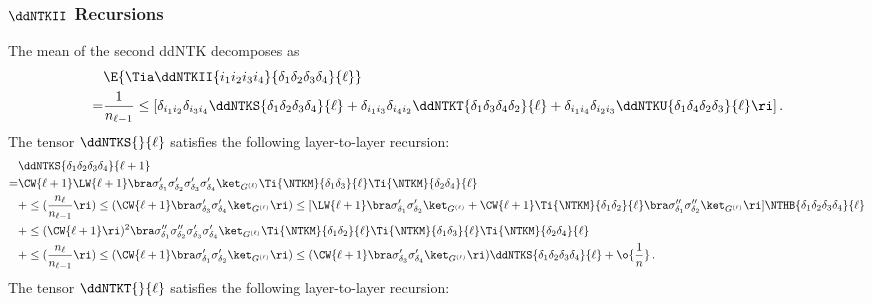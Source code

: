 \subsubsection{$\ddNTKII$ Recursions}
The mean of the second ddNTK decomposes as
\begin{align}
&\E{\Tia\ddNTKII{i_1i_2i_3i_4}{\delta_1\delta_2\delta_3\delta_4}{\ell}}\, \\
=&\frac{1}{n_{\ell-1}}\le[\delta_{i_1i_2}\delta_{i_3i_4}\ddNTKS{\delta_1\delta_2\delta_3\delta_4}{\ell}+\delta_{i_1i_3}\delta_{i_4i_2}\ddNTKT{\delta_1\delta_3\delta_4\delta_2}{\ell}+\delta_{i_1i_4}\delta_{i_2i_3}\ddNTKU{\delta_1\delta_4\delta_2\delta_3}{\ell}\ri]\, .\notag
\end{align}
The tensor $\ddNTKS{}{\ell}$ satisfies the following layer-to-layer recursion:
\begin{align}\label{eq:S-recursion}\index{ddNTKs!statistics!S-recursion@$S$-recursion}
&\ddNTKS{\delta_1\delta_2\delta_3\delta_4}{\ell+1}\, \\
=&\CW{\ell+1}\LW{\ell+1}\bra \sigma^{\prime}_{\delta_1} \sigma^{\prime}_{\delta_2} \sigma^{\prime}_{\delta_3}\sigma^{\prime}_{\delta_4}\ket_{G^{(\ell)}}\Ti{\NTKM}{\delta_1\delta_3}{\ell}\Ti{\NTKM}{\delta_2\delta_4}{\ell}\, \notag\\
&+\le(\frac{n_{\ell}}{n_{\ell-1}}\ri)\le(\CW{\ell+1}\bra \sigma^{\prime}_{\delta_3}\sigma^{\prime}_{\delta_4}\ket_{G^{(\ell)}}\ri)\le[\LW{\ell+1}\bra \sigma^{\prime}_{\delta_1}\sigma^{\prime}_{\delta_2}\ket_{G^{(\ell)}}+\CW{\ell+1}\Ti{\NTKM}{\delta_1\delta_2}{\ell}\bra \sigma^{\prime\prime}_{\delta_1}\sigma^{\prime\prime}_{\delta_2}\ket_{G^{(\ell)}}\ri]\NTHB{\delta_1\delta_2\delta_3\delta_4}{\ell}\, \notag\\
&+\le(\CW{\ell+1}\ri)^2\bra \sigma^{\prime\prime}_{\delta_1} \sigma^{\prime\prime}_{\delta_2} \sigma^{\prime}_{\delta_3}\sigma^{\prime}_{\delta_4}\ket_{G^{(\ell)}}\Ti{\NTKM}{\delta_1\delta_2}{\ell}\Ti{\NTKM}{\delta_1\delta_3}{\ell}\Ti{\NTKM}{\delta_2\delta_4}{\ell}\, \notag\\
&+\le(\frac{n_{\ell}}{n_{\ell-1}}\ri)\le(\CW{\ell+1}\bra \sigma^{\prime}_{\delta_1}\sigma^{\prime}_{\delta_2}\ket_{G^{(\ell)}}\ri)\le(\CW{\ell+1}\bra \sigma^{\prime}_{\delta_3}\sigma^{\prime}_{\delta_4}\ket_{G^{(\ell)}}\ri)\ddNTKS{\delta_1\delta_2\delta_3\delta_4}{\ell}+\o{\frac{1}{n}}\, .\notag
\end{align}
The tensor $\ddNTKT{}{\ell}$ satisfies the following layer-to-layer recursion:

